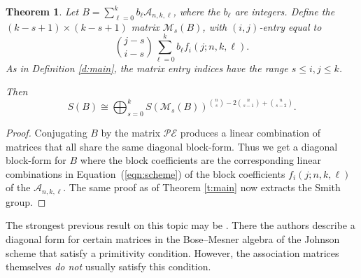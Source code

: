 \documentclass[11pt]{article}
\newtheorem{theorem}[theo]{Theorem}
\theoremstyle{definition}
\numberwithin{equation}{section}
\numberwithin{equation}{section}
\renewcommand{\P}{\mathcal{P}}
\newcommand{\M}{\mathcal{M}}
\newcommand{\E}{\mathcal{E}}
\newcommand{\A}{\mathcal{A}}
\begin{document}
\begin{theorem}\label{t:j_scheme}
Let $B = \sum_{\ell = 0}^{k} b_{\ell} \A_{n,k,\ell}$, where the $b_{\ell}$ are integers.  Define the \mbox{$(k-s+1) \times (k-s+1)$} matrix $\M_{s}(B)$, with $(i,j)$-entry equal to
\begin{equation}\label{eqn:scheme}
\binom{j-s}{i-s}\sum_{\ell = 0}^{k} b_{\ell} f_i(j; n, k, \ell).
\end{equation}
As in Definition \ref{d:main}, the matrix entry indices have the range $s \leq i, j \leq k$.

Then 
\[
S(B) \cong \bigoplus_{s=0}^{k} S(\M_s(B))^{ \binom{n}{s} - 2 \binom{n}{s-1} + \binom{n}{s-2}}.
\]
\end{theorem}
\begin{proof}
    Conjugating $B$ by the matrix $\P \E$ produces a linear combination of matrices that all share the same diagonal block-form.  Thus we get a diagonal block-form for $B$ where the block coefficients are the corresponding linear combinations in Equation~(\ref{eqn:scheme}) of the block coefficients $f_i(j; n, k, \ell)$ of the $\A_{n,k,\ell}$. 
 The same proof as of Theorem \ref{t:main} now extracts the Smith group.
\end{proof}

The strongest previous result on this topic may be \cite[Theorem 9]{wong}.  There the authors describe a diagonal form for certain matrices in the Bose--Mesner algebra of the Johnson scheme that satisfy a primitivity condition.  However, the association matrices themselves \textit{do not} usually satisfy this condition.
\end{document}

